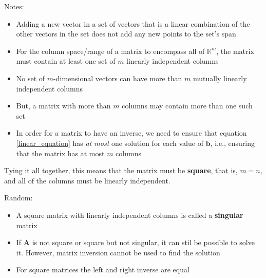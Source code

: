 \documentclass[11pt,twocolumn]{report}
\def\realnumbers{\mathbb{R}}
\begin{document}
Notes:
\begin{itemize}
  \item Adding a new vector in a set of vectors that is a linear combination of
    the other vectors in the set does not add any new points to the set's span
  \item For the column space/range of a matrix to encompass all of
    $\realnumbers^m$, the matrix must contain at least one set of $m$ linearly
    independent columns
  \item No set of $m$-dimensional vectors can have more than $m$ mutually
    linearly independent columns
  \item But, a matrix with more than $m$ columns may contain more than one such
    set
  \item In order for a matrix to have an inverse, we need to ensure that
    equation \ref{linear_equation} has \textit{at most} one solution for each
    value of $\bm{b}$, i.e., ensuring that the matrix has at most $m$ columns
\end{itemize}

Tying it all together, this means that the matrix must be \textbf{square}, that
is, $m=n$, and all of the columns must be linearly independent.

Random:
\begin{itemize}
  \item A square matrix with linearly independent columns is called a
    \textbf{singular} matrix 
  \item If $\bm{A}$ is not square or square but not singular, it can stil be
    possible to solve it.  However, matrix inversion cannot be used to find the
    solution
  \item For square matrices the left and right inverse are equal
\end{itemize}
\end{document}
